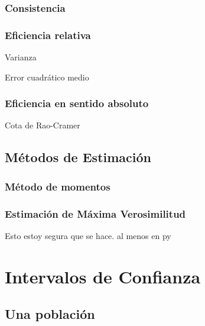 \documentclass[]{article}
\begin{document}
\hypertarget{consistencia}{%
\subsubsection{Consistencia}\label{consistencia}}

\hypertarget{eficiencia-relativa}{%
\subsubsection{Eficiencia relativa}\label{eficiencia-relativa}}

Varianza

Error cuadrático medio

\hypertarget{eficiencia-en-sentido-absoluto}{%
\subsubsection{Eficiencia en sentido
absoluto}\label{eficiencia-en-sentido-absoluto}}

Cota de Rao-Cramer

\hypertarget{metodos-de-estimacion}{%
\subsection{Métodos de Estimación}\label{metodos-de-estimacion}}

\hypertarget{metodo-de-momentos}{%
\subsubsection{Método de momentos}\label{metodo-de-momentos}}

\hypertarget{estimacion-de-maxima-verosimilitud}{%
\subsubsection{Estimación de Máxima
Verosimilitud}\label{estimacion-de-maxima-verosimilitud}}

Esto estoy segura que se hace. al menos en py

\hypertarget{intervalos-de-confianza}{%
\section{Intervalos de Confianza}\label{intervalos-de-confianza}}

\hypertarget{una-poblacion}{%
\subsection{Una población}\label{una-poblacion}}
\end{document}
